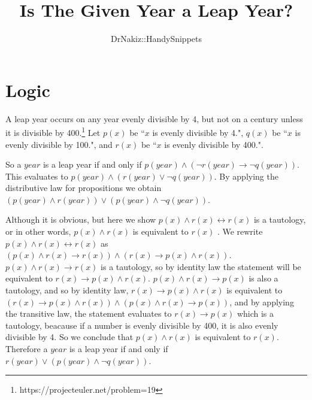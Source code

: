 \documentclass{article}
\author{DrNakiz::HandySnippets}
\title{Is The Given Year a Leap Year?}
\begin{document}
\maketitle

\section{Logic}

A leap year occurs on any year evenly divisible by 4, but not on a century 
unless it is divisible by 400.\footnote{https://projecteuler.net/problem=19}
Let $p(x)$ be ``$x$ is evenly divisible by 4.", $q(x)$ be ``$x$ is evenly
divisible by 100.", and $r(x)$ be ``$x$ is evenly divisible by 400.".

So a $year$ is a leap year if and only if $p(year)\wedge(\neg r(year)
\rightarrow \neg q(year))$. This evaluates to $p(year)\wedge(r(year)\vee \neg 
q(year))$. By applying the distributive law for propositions we obtain $(p(yea
r)\wedge r(year)) \vee (p(year)\wedge \neg q(year))$.

Although it is obvious, but here we show $p(x) \wedge r(x) \leftrightarrow r(x)
$ is a tautology, or in other words, $p(x) \wedge r(x)$ is equivalent to $r(x)$
. We rewrite $p(x) \wedge r(x) \leftrightarrow r(x)$ as $(p(x) \wedge r(x) 
\rightarrow r(x)) \wedge (r(x) \rightarrow p(x) \wedge r(x))$. $p(x) \wedge
r(x) \rightarrow r(x)$ is a tautology, so by identity law the statement will 
be equivalent to $r(x) \rightarrow p(x) \wedge r(x)$. $p(x) \wedge r(x)
\rightarrow p(x)$ is also a tautology, and so by identity law, $r(x) 
\rightarrow p(x) \wedge r(x)$ is equivalent to $(r(x) \rightarrow p(x) \wedge
r(x)) \wedge (p(x) \wedge r(x) \rightarrow p(x))$, and by applying the 
transitive law, the statement evaluates to $r(x) \rightarrow p(x)$ which is a
tautology, beacause if a number is evenly divisible by 400, it is also evenly 
divisible by 4. So we conclude that $p(x) \wedge r(x)$ is equivalent to $r(x)$.
Therefore a $year$ is a leap year if and only if $r(year) \vee (p(year)\wedge
\neg q(year))$.
\end{document}
